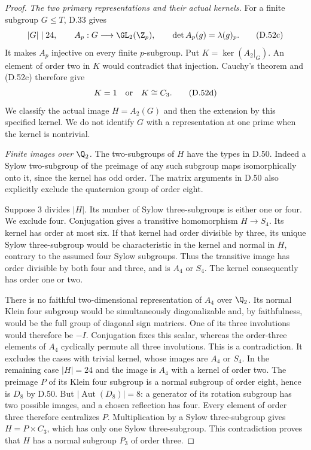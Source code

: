 \begin{proof}
\emph{The two primary representations and their actual kernels.}
For a finite subgroup $G\leq T$, D.33 gives
\[
 |G|\mid24,\qquad
 A_p:G\longrightarrow\GL_2(\Z_p),\qquad
 \det A_p(g)=\lambda(g)_p.                              \tag{D.52c}
\]
It makes $A_p$ injective on every finite
$p$-subgroup. Put $K=\ker(A_2|_G)$.
An element of order two in $K$ would contradict
that injection. Cauchy's theorem and (D.52c)
therefore give
\[
                      K=1\quad\hbox{or}\quad K\cong C_3.
                                                               \tag{D.52d}
\]
We classify the actual image $H=A_2(G)$ and
then the extension by this specified kernel.
We do not identify $G$ with a representation
at one prime when the kernel is nontrivial.

\emph{Finite images over $\Q_2$.}
The two-subgroups of $H$ have the types in D.50.
Indeed a Sylow two-subgroup of the preimage
of any such subgroup maps isomorphically onto
it, since the kernel has odd order.
The matrix arguments in D.50 also explicitly
exclude the quaternion group of order eight.

Suppose $3$ divides $|H|$.
Its number of Sylow three-subgroups is either
one or four. We exclude four.
Conjugation gives a transitive homomorphism
$H\to S_4$. Its kernel has order at most six.
If that kernel had order divisible by three,
its unique Sylow three-subgroup would be
characteristic in the kernel and normal in $H$,
contrary to the assumed four Sylow subgroups.
Thus the transitive image has order divisible
by both four and three, and is $A_4$ or $S_4$.
The kernel consequently has order one or two.

There is no faithful two-dimensional
representation of $A_4$ over $\Q_2$.
Its normal Klein four subgroup would be
simultaneously diagonalizable and, by
faithfulness, would be the full group
of diagonal sign matrices. One of its
three involutions would therefore be $-I$.
Conjugation fixes this scalar, whereas the
order-three elements of $A_4$ cyclically
permute all three involutions.
This is a contradiction.
It excludes the cases with trivial kernel,
whose images are $A_4$ or $S_4$.
In the remaining case $|H|=24$ and the image
is $A_4$ with a kernel of order two.
The preimage $P$ of its Klein four subgroup
is a normal subgroup of order eight, hence
is $D_8$ by D.50. But
$|\operatorname{Aut}(D_8)|=8$: a generator
of its rotation subgroup has two possible
images, and a chosen reflection has four.
Every element of order three therefore
centralizes $P$. Multiplication by a Sylow
three-subgroup gives $H=P\times C_3$, which
has only one Sylow three-subgroup.
This contradiction proves that $H$ has a
normal subgroup $P_3$ of order three.


\end{proof}
